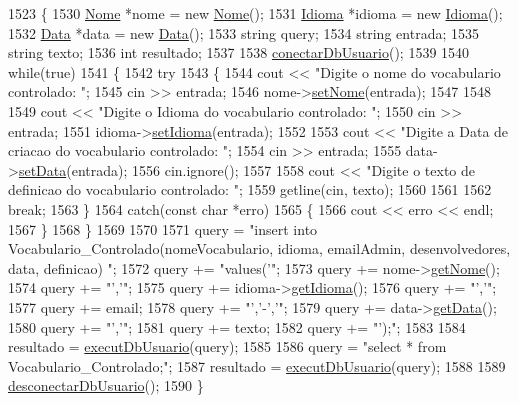 \begin{DoxyCode}
1523  \{
1530    \mbox{\hyperlink{class_nome}{Nome}} *nome = \textcolor{keyword}{new} \mbox{\hyperlink{class_nome}{Nome}}();
1531    \mbox{\hyperlink{class_idioma}{Idioma}} *idioma = \textcolor{keyword}{new} \mbox{\hyperlink{class_idioma}{Idioma}}();
1532    \mbox{\hyperlink{class_data}{Data}} *data = \textcolor{keyword}{new} \mbox{\hyperlink{class_data}{Data}}();
1533    \textcolor{keywordtype}{string} query;
1534    \textcolor{keywordtype}{string} entrada;
1535    \textcolor{keywordtype}{string} texto;
1536    \textcolor{keywordtype}{int} resultado;
1537 
1538    \mbox{\hyperlink{comando_sql_8cpp_a4f89ddcbc4cf8f2587d89f72f8c7900d}{conectarDbUsuario}}();
1539 
1540    \textcolor{keywordflow}{while}(\textcolor{keyword}{true})
1541    \{
1542      \textcolor{keywordflow}{try}
1543      \{
1544        cout << \textcolor{stringliteral}{"Digite o nome do vocabulario controlado: "};
1545        cin >> entrada;
1546        nome->\mbox{\hyperlink{class_nome_a83b9f56ec9f86f4b976846f4c5c65b30}{setNome}}(entrada);
1547 
1548 
1549        cout << \textcolor{stringliteral}{"Digite o Idioma do vocabulario controlado: "};
1550        cin >> entrada;
1551        idioma->\mbox{\hyperlink{class_idioma_a5c15660dcb0cec1db37a013b990d9895}{setIdioma}}(entrada);
1552 
1553        cout << \textcolor{stringliteral}{"Digite a Data de criacao do vocabulario controlado: "};
1554        cin >> entrada;
1555        data->\mbox{\hyperlink{class_data_a5245638838a033c98a8b760836dddb7d}{setData}}(entrada);
1556        cin.ignore();
1557 
1558        cout << \textcolor{stringliteral}{"Digite o texto de definicao do vocabulario controlado: "};
1559        getline(cin, texto);
1560 
1561 
1562        \textcolor{keywordflow}{break};
1563      \}
1564      \textcolor{keywordflow}{catch}(\textcolor{keyword}{const} \textcolor{keywordtype}{char} *erro)
1565      \{
1566        cout << erro << endl;
1567      \}
1568    \}
1569 
1570 
1571    query = \textcolor{stringliteral}{"insert into Vocabulario\_Controlado(nomeVocabulario, idioma, emailAdmin, desenvolvedores, data,
       definicao) "};
1572    query += \textcolor{stringliteral}{"values('"};
1573    query += nome->\mbox{\hyperlink{class_nome_aad41176173eec20cbbae1576447a3697}{getNome}}();
1574    query += \textcolor{stringliteral}{"','"};
1575    query += idioma->\mbox{\hyperlink{class_idioma_ab2f6141eec870d6c40f6ec8d32e68231}{getIdioma}}();
1576    query += \textcolor{stringliteral}{"','"};
1577    query += email;
1578    query += \textcolor{stringliteral}{"','-','"};
1579    query += data->\mbox{\hyperlink{class_data_afc7b15a5e81334858e48709b2f45cdc3}{getData}}();
1580    query += \textcolor{stringliteral}{"','"};
1581    query += texto;
1582    query += \textcolor{stringliteral}{"');"};
1583 
1584    resultado = \mbox{\hyperlink{comando_sql_8cpp_a748197580e7f9acdbf48c78de1f7924b}{executDbUsuario}}(query);
1585 
1586    query = \textcolor{stringliteral}{"select * from Vocabulario\_Controlado;"};
1587    resultado = \mbox{\hyperlink{comando_sql_8cpp_a748197580e7f9acdbf48c78de1f7924b}{executDbUsuario}}(query);
1588 
1589    \mbox{\hyperlink{comando_sql_8cpp_a969be9911913568e30d4ae8963338bc3}{desconectarDbUsuario}}();
1590  \}
\end{DoxyCode}
